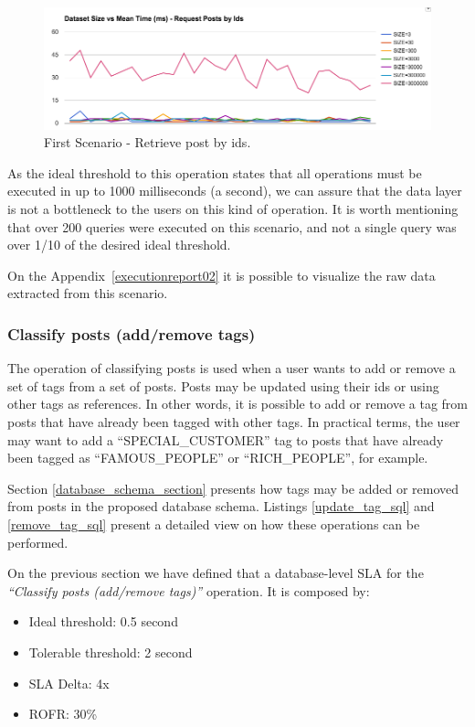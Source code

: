 \begin{figure}
\centering
\includegraphics[width=150mm]{Imagens/execution-01.png}
\caption{First Scenario - Retrieve post by ids.\label{fig:first_scenario}}
\end{figure}

As the ideal threshold to this operation states that all operations must be executed in up to 1000 milliseconds (a second), we can assure that the data layer is not a bottleneck to the users on this kind of operation. It is worth mentioning that over 200 queries were executed on this scenario, and not a single query was over 1/10 of the desired ideal threshold.

On the Appendix~\ref{executionreport02} it is possible to visualize the raw data extracted from this scenario. 

\clearpage
\subsubsection{Classify posts (add/remove tags)}

The operation of classifying posts is used when a user wants to add or remove a set of tags from a set of posts. Posts may be updated using their ids or using other tags as references. In other words, it is possible to add or remove a tag from posts that have already been tagged with other tags. In practical terms, the user may want to add a ``SPECIAL\_CUSTOMER'' tag to posts that have already been tagged as ``FAMOUS\_PEOPLE'' or ``RICH\_PEOPLE'', for example. 

Section \ref{database_schema_section} presents how tags may be added or removed from posts in the proposed database schema. Listings \ref{update_tag_sql} and \ref{remove_tag_sql} present a detailed view on how these operations can be performed. 

On the previous section we have defined that a database-level SLA for the \textit{``Classify posts (add/remove tags)''} operation. It is composed by: 

\begin{itemize}
	\item{Ideal threshold: 0.5 second}
	\item{Tolerable threshold: 2 second}
	\item{SLA Delta: 4x}
	\item{ROFR: 30\%}
\end{itemize}

